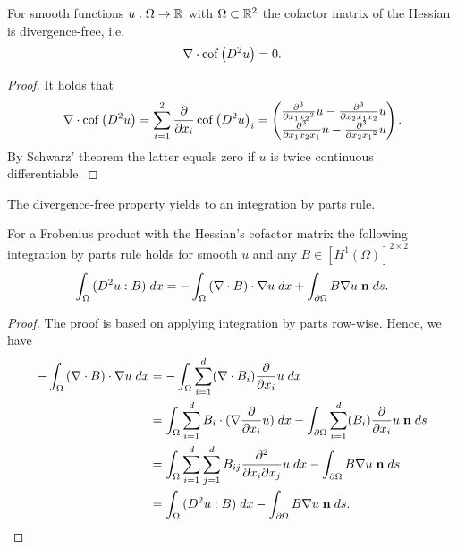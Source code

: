 \begin{lemma} \label{la: divergence free cof}
For smooth functions $u:\Omega \rightarrow \mathbb{R}$ with $\Omega \subset \mathbb{R}^2$ the cofactor matrix of the Hessian is divergence-free, i.e.
\[
	\nabla \cdot \operatorname{cof} \left( D^2 u \right) = 0.
\] 
\end{lemma}
\begin{proof}
It holds that
\begin{align*}
	\nabla \cdot \operatorname{cof} \left( D^2 u \right) = \sum_{i=1}^{2} \frac \partial {\partial  x_i}\operatorname{cof} \left( D^2 u \right)_i = 
	\begin{pmatrix}
		\frac {\partial^3} {\partial x_1 {x_2}^2 } u -\frac {\partial^3} {\partial{x_2} x_1 {x_2}} u\\
				\frac {\partial^3} {\partial {x_1}x_2 {x_1}} u-\frac {\partial^3} {\partial x_2 {x_1}^2 } u
	\end{pmatrix}.
\end{align*}
By Schwarz' theorem the latter equals zero if $u$ is twice continuous differentiable.
\end{proof}

The divergence-free property yields to an integration by parts rule.
\begin{lemma} \label{la: integration by parts Frobenius}
For a Frobenius product with the Hessian's cofactor matrix  the following integration by parts rule holds for smooth $u$ and any $B \in [H^1(\Omega)]^{2 \times 2}$
\[
	\int_{\Omega} {{ (D^2 u : B)}\;dx} = 
		- \int_{\Omega} {{ (\nabla \cdot B) \cdot \nabla u }\;dx}
		+ \int_{\partial \Omega} {{  B \nabla u \;\bf n}\;ds}.
\] 
\end{lemma}

\begin{proof}
The proof is based on applying integration by parts row-wise. Hence, we have
\begin{align*}
- \int_{\Omega} {{ (\nabla \cdot B) \cdot \nabla u}\;dx} &= 
- \int_{\Omega} {{ \sum_{i = 1}^{d} (\nabla \cdot B_i) \frac \partial {\partial x_i} u}\;dx} \\
&=  \int_{\Omega} {{ \sum_{i = 1}^{d} B_i \cdot  (\nabla \frac \partial {\partial x_i} u)}\;dx} 
	- \int_{\partial \Omega} {{ \sum_{i = 1}^{d} (B_i) \frac \partial {\partial x_i} u \;\mathbf{n}}\;ds} \\
&=  \int_{\Omega} {{ \sum_{i = 1}^{d}\sum_{j= 1}^{d} B_{ij} \frac {\partial^2} {\partial x_i\partial x_j} u}\;dx}
	- \int_{\partial \Omega} {{ B \nabla u \;\mathbf{n}}\;ds} \\
&=  \int_{\Omega} {{ (D^2 u : B)}\;dx}
	- \int_{\partial \Omega} {{ B \nabla u \;\mathbf{n} }\;ds}.
\end{align*}
\end{proof}

